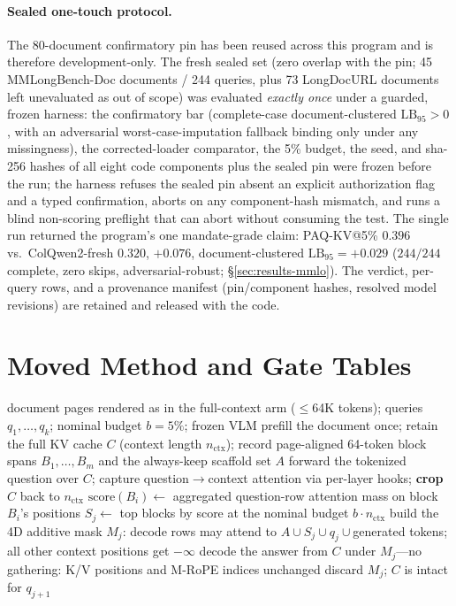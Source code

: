 \documentclass[letterpaper]{article} %
\newcommand{\paqc}{\textsc{PAQ-KV}}
\newcommand{\lb}{\mathrm{LB}_{95}}
\begin{document}
\paragraph{Sealed one-touch protocol.} The 80-document confirmatory pin has been reused across this program and is therefore development-only. The fresh sealed set (zero overlap with the pin; 45 MMLongBench-Doc documents / 244 queries, plus 73 LongDocURL documents left unevaluated as out of scope) was evaluated \emph{exactly once} under a guarded, frozen harness: the confirmatory bar (complete-case document-clustered $\lb>0$, with an adversarial worst-case-imputation fallback binding only under any missingness), the corrected-loader comparator, the 5\% budget, the seed, and sha-256 hashes of all eight code components plus the sealed pin were frozen before the run; the harness refuses the sealed pin absent an explicit authorization flag and a typed confirmation, aborts on any component-hash mismatch, and runs a blind non-scoring preflight that can abort without consuming the test. The single run returned the program's one mandate-grade claim: \paqc{}@5\% $0.396$ vs.\ ColQwen2-fresh $0.320$, $+0.076$, document-clustered $\lb=+0.029$ ($244/244$ complete, zero skips, adversarial-robust; \S\ref{sec:results-mmlo}). The verdict, per-query rows, and a provenance manifest (pin/component hashes, resolved model revisions) are retained and released with the code.

\section{Moved Method and Gate Tables}\label{app:method-materials}

\begin{algorithm}[t]
\caption{\paqc{}: per-query reversible below-page KV-block selection with a 4D restricted-attention mask}
\label{alg:paqc}
\begin{algorithmic}[1]
\REQUIRE document pages rendered as in the full-context arm ($\le$64K tokens); queries $q_1,\ldots,q_k$; nominal budget $b=5\%$; frozen VLM
\STATE prefill the document once; retain the full KV cache $C$ (context length $n_{\mathrm{ctx}}$); record page-aligned 64-token block spans $B_1,\ldots,B_m$ and the always-keep scaffold set $A$
\STATE forward the tokenized question over $C$; capture question$\to$context attention via per-layer hooks; \textbf{crop} $C$ back to $n_{\mathrm{ctx}}$
\STATE $\mathrm{score}(B_i) \gets$ aggregated question-row attention mass on block $B_i$'s positions
\STATE $S_j \gets$ top blocks by score at the nominal budget $b \cdot n_{\mathrm{ctx}}$
\STATE build the 4D additive mask $M_j$: decode rows may attend to $A \cup S_j \cup q_j \cup{}$generated tokens; all other context positions get $-\infty$
\STATE decode the answer from $C$ under $M_j$---no gathering: K/V positions and M-RoPE indices unchanged
\STATE discard $M_j$; $C$ is intact for $q_{j+1}$
\ENDFOR
\end{algorithmic}
\end{algorithm}
\end{document}
